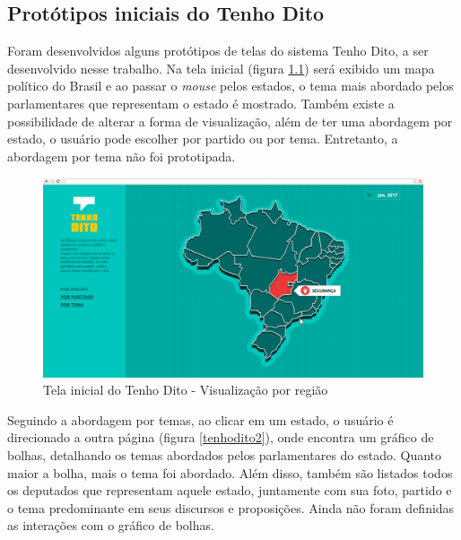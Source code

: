 \begin{apendicesenv}

\partapendices

\chapter{Protótipos iniciais do Tenho Dito}
\label{prototipos-apendice}

Foram desenvolvidos alguns protótipos de telas do sistema Tenho Dito, a ser desenvolvido nesse trabalho. Na tela inicial (figura \ref{tenhodito1}) será exibido um mapa político do Brasil e ao passar o \textit{mouse} pelos estados, o tema mais abordado pelos parlamentares que representam o estado é mostrado. Também existe a possibilidade de alterar a forma de visualização, além de ter uma abordagem por estado, o usuário pode escolher por partido ou por tema. Entretanto, a abordagem por tema não foi prototipada.

\begin{figure}[h]
  \centering
  \includegraphics[scale=0.2]{figuras/tenhodito1.eps}
  \caption{Tela inicial do Tenho Dito - Visualização por região}
  \label{tenhodito1}
\end{figure}

Seguindo a abordagem por temas, ao clicar em um estado, o usuário é direcionado a outra página (figura \ref{tenhodito2}), onde encontra um gráfico de bolhas, detalhando os temas abordados pelos parlamentares do estado. Quanto maior a bolha, mais o tema foi abordado. Além disso, também são listados todos os deputados que representam aquele estado, juntamente com sua foto, partido e o tema predominante em seus discursos e proposições. Ainda não foram definidas as interações com o gráfico de bolhas.


\end{apendicesenv}
